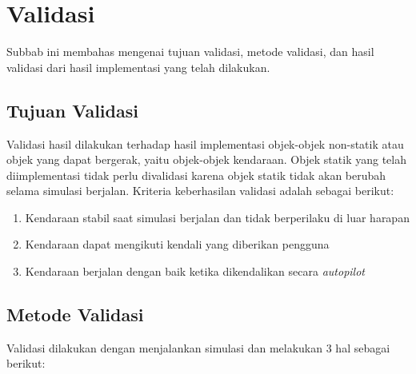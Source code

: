 \section{Validasi}

Subbab ini membahas mengenai tujuan validasi, metode validasi, dan hasil
validasi dari hasil implementasi yang telah dilakukan.

\subsection{Tujuan Validasi}

Validasi hasil dilakukan terhadap hasil implementasi objek-objek non-statik atau
objek yang dapat bergerak, yaitu objek-objek kendaraan. Objek statik yang telah
diimplementasi tidak perlu divalidasi karena objek statik tidak akan berubah
selama simulasi berjalan. Kriteria keberhasilan validasi adalah sebagai berikut:

\begin{enumerate}
    \item Kendaraan stabil saat simulasi berjalan dan tidak berperilaku di luar
    harapan
    \item Kendaraan dapat mengikuti kendali yang diberikan pengguna
    \item Kendaraan berjalan dengan baik ketika dikendalikan secara
    \textit{autopilot}
\end{enumerate}

\subsection{Metode Validasi}

Validasi dilakukan dengan menjalankan simulasi dan melakukan 3 hal sebagai
berikut:

